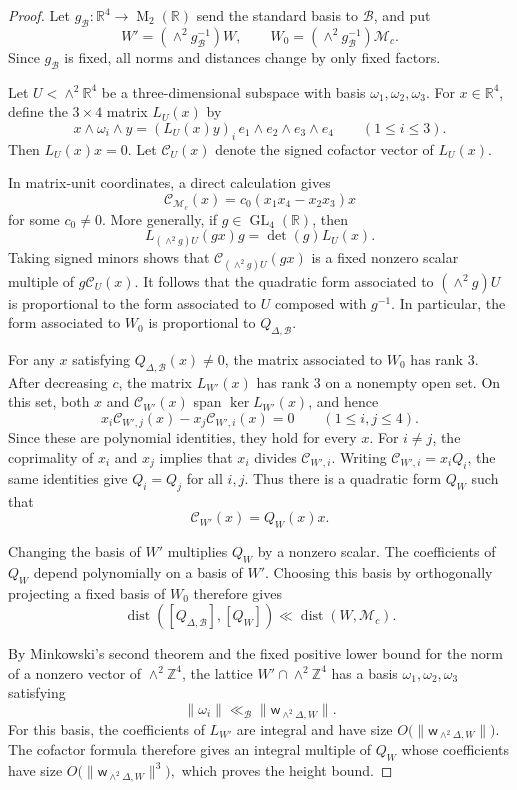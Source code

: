 \documentclass[reqno,11pt]{amsart}
\theoremstyle{definition}
\theoremstyle{remark}
\numberwithin{equation}{section}
\newcommand{\M}{\operatorname{M}}
\newcommand{\GL}{\operatorname{GL}}
\begin{document}
\begin{proof}
Let $g_{\mathcal B}:\mathbb R^4\to\M_2(\mathbb R)$ send the standard basis
to $\mathcal B$, and put
$$
W'
=
(\wedge^2g_{\mathcal B}^{-1})W,
\qquad
W_0
=
(\wedge^2g_{\mathcal B}^{-1})\mathcal M_c.
$$
Since $g_{\mathcal B}$ is fixed, all norms and distances change by only
fixed factors.

Let $U<\wedge^2\mathbb R^4$ be a three-dimensional subspace with basis
$\omega_1,\omega_2,\omega_3$. For $x\in\mathbb R^4$, define the
$3\times4$ matrix $L_U(x)$ by
$$
x\wedge\omega_i\wedge y
=
(L_U(x)y)_i\,
e_1\wedge e_2\wedge e_3\wedge e_4
\qquad
(1\le i\le3).
$$
 Then
$L_U(x)x=0$. Let $\mathcal C_U(x)$ denote the signed cofactor vector of
$L_U(x)$.

In matrix-unit coordinates, a direct calculation gives
$$
\mathcal C_{\mathcal M_c}(x)
=
c_0(x_1x_4-x_2x_3)x
$$
for some $c_0\ne0$. More generally, if $g\in\GL_4(\mathbb R)$, then
$$
L_{(\wedge^2g)U}(gx)g
=
\det(g)L_U(x).
$$
Taking signed minors shows that
$\mathcal C_{(\wedge^2g)U}(gx)$ is a fixed nonzero scalar multiple of
$g\mathcal C_U(x)$. It follows that the quadratic form associated to
$(\wedge^2g)U$ is proportional to the form associated to $U$ composed
with $g^{-1}$. In particular, the form associated to $W_0$ is proportional
to $Q_{\Delta,\mathcal B}$.

For any $x$ satisfying $Q_{\Delta,\mathcal B}(x)\ne0$, the matrix
associated to $W_0$ has rank $3$. After decreasing $c$, the matrix
$L_{W'}(x)$ has rank $3$ on a nonempty open set. On this set, both $x$ and
$\mathcal C_{W'}(x)$ span $\ker L_{W'}(x)$, and hence
$$
x_i\mathcal C_{W',j}(x)-x_j\mathcal C_{W',i}(x)=0
\qquad
(1\le i,j\le4).
$$
Since these are polynomial identities, they hold for every $x$. For
$i\ne j$, the coprimality of $x_i$ and $x_j$ implies that $x_i$ divides
$\mathcal C_{W',i}$. Writing
$\mathcal C_{W',i}=x_iQ_i$, the same identities give $Q_i=Q_j$ for all
$i,j$. Thus there is a quadratic form $Q_W$ such that
\begin{equation}\label{eq:cofactor-reconstruction}
\mathcal C_{W'}(x)=Q_W(x)x.
\end{equation}

Changing the basis of $W'$ multiplies $Q_W$ by a nonzero scalar. The
coefficients of $Q_W$ depend polynomially on a basis of $W'$. Choosing
this basis by orthogonally projecting a fixed basis of $W_0$ therefore
gives
$$
\operatorname{dist}([Q_{\Delta,\mathcal B}],[Q_W])
\ll
\operatorname{dist}(W,\mathcal M_c).
$$

By Minkowski's second theorem and the fixed positive lower bound for the
norm of a nonzero vector of $\wedge^2\mathbb Z^4$, the lattice
$W'\cap\wedge^2\mathbb Z^4$ has a basis
$\omega_1,\omega_2,\omega_3$ satisfying
$$
\|\omega_i\|
\ll_{\mathcal B}
\|\mathsf w_{\wedge^2\Delta,W}\|.
$$
For this basis, the coefficients of $L_{W'}$ are integral and have size
$
O\bigl(\|\mathsf w_{\wedge^2\Delta,W}\|\bigr).
$
The cofactor formula therefore gives an integral multiple of $Q_W$ whose
coefficients have size
$
O\bigl(\|\mathsf w_{\wedge^2\Delta,W}\|^3\bigr),
$
which proves the height bound.


\end{proof}
\end{document}
